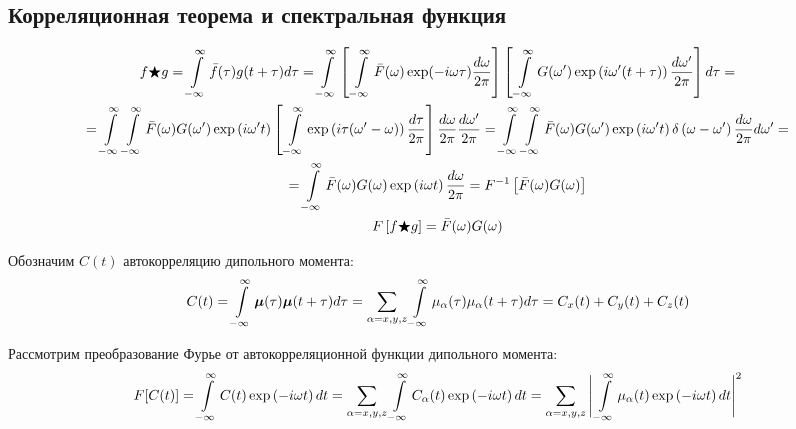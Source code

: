 \subsection*{Корреляционная теорема и спектральная функция}

\begin{gather}
	f \bigstar g = \int\limits_{-\infty}^{\infty} \bar{f}(\tau) g(t + \tau) d \tau = \int\limits_{-\infty}^{\infty} \left[ \, \int\limits_{-\infty}^{\infty} \bar{F}(\omega) \exp(-i \omega \tau) \frac{d \omega}{2 \pi} \right] \left[ \, \int\limits_{-\infty}^{\infty} G(\omega^\prime) \exp \left( i \omega^\prime ( t + \tau) \right) \frac{d \omega^\prime}{2 \pi} \right] d \tau = \notag \\
	= \int\limits_{-\infty}^{\infty} \int\limits_{-\infty}^{\infty} \bar{F}(\omega) G(\omega^\prime) \exp \left( i \omega^\prime t \right) \left[ \, \int\limits_{-\infty}^{\infty} \exp \left( i \tau (\omega^\prime - \omega) \right) \frac{d \tau}{2 \pi} \right] \frac{d \omega}{2 \pi} \frac{d \omega^\prime}{2 \pi} = \int\limits_{-\infty}^{\infty} \int\limits_{-\infty}^{\infty} \bar{F}(\omega)G(\omega^\prime) \exp \left( i \omega^\prime t \right)  \delta \left( \omega - \omega^\prime \right) \frac{d \omega}{2 \pi} d \omega^\prime = \notag \\
	= \int\limits_{-\infty}^{\infty} \bar{F}(\omega) G(\omega) \exp \left( i \omega t \right) \frac{d \omega}{2 \pi} = F^{-1} \left[ \bar{F}(\omega) G(\omega) \right] \notag \\
	F \left[ f \bigstar g \right] = \bar{F}(\omega) G(\omega) \notag
\end{gather}

Обозначим $C(t)$ автокорреляцию дипольного момента:
\vverh
\begin{gather}
	C(t) = \int\limits_{-\infty}^{\infty} \boldsymbol{\mu}(\tau) \boldsymbol{\mu}(t + \tau) d \tau = \sum_{\alpha = x, y, z} \int\limits_{-\infty}^{\infty} \mu_\alpha(\tau) \mu_\alpha(t + \tau) d \tau = C_x (t) + C_y(t) + C_z(t) \notag
\end{gather}

Рассмотрим преобразование Фурье от автокорреляционной функции дипольного момента:
\vverh \vverh 
\begin{gather}
	F[C(t)] = \int\limits_{-\infty}^{\infty} C(t) \exp \left( - i \omega t \right) dt = \sum_{\alpha = x, y, z} \int\limits_{-\infty}^{\infty} C_\alpha(t) \exp \left( - i \omega t \right) dt = \sum_{\alpha = x, y, z} \Bigg{|} \int\limits_{-\infty}^{\infty} \mu_\alpha(t) \exp \left( - i \omega t \right) dt \Bigg{|}^2 \notag
\end{gather}

